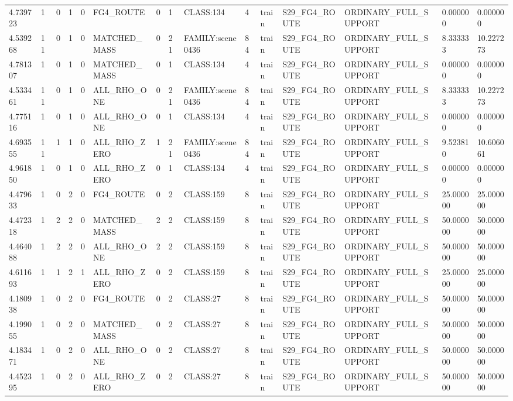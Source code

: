 \begin{tabular}{lllllllllllllll}
4.739723 & 1 & 0 & 1 & 0 & FG4\_ROUTE & 0 & 1 & CLASS:134 & 4 & train & S29\_FG4\_ROUTE & ORDINARY\_FULL\_SUPPORT & 0.000000 & 0.000000 \\
4.539268 & 11 & 0 & 1 & 0 & MATCHED\_MASS & 0 & 21 & FAMILY:scene0436 & 84 & train & S29\_FG4\_ROUTE & ORDINARY\_FULL\_SUPPORT & 8.333333 & 10.227273 \\
4.781307 & 1 & 0 & 1 & 0 & MATCHED\_MASS & 0 & 1 & CLASS:134 & 4 & train & S29\_FG4\_ROUTE & ORDINARY\_FULL\_SUPPORT & 0.000000 & 0.000000 \\
4.533461 & 11 & 0 & 1 & 0 & ALL\_RHO\_ONE & 0 & 21 & FAMILY:scene0436 & 84 & train & S29\_FG4\_ROUTE & ORDINARY\_FULL\_SUPPORT & 8.333333 & 10.227273 \\
4.775116 & 1 & 0 & 1 & 0 & ALL\_RHO\_ONE & 0 & 1 & CLASS:134 & 4 & train & S29\_FG4\_ROUTE & ORDINARY\_FULL\_SUPPORT & 0.000000 & 0.000000 \\
4.693555 & 11 & 1 & 1 & 0 & ALL\_RHO\_ZERO & 1 & 21 & FAMILY:scene0436 & 84 & train & S29\_FG4\_ROUTE & ORDINARY\_FULL\_SUPPORT & 9.523810 & 10.606061 \\
4.961850 & 1 & 0 & 1 & 0 & ALL\_RHO\_ZERO & 0 & 1 & CLASS:134 & 4 & train & S29\_FG4\_ROUTE & ORDINARY\_FULL\_SUPPORT & 0.000000 & 0.000000 \\
4.479633 & 1 & 0 & 2 & 0 & FG4\_ROUTE & 0 & 2 & CLASS:159 & 8 & train & S29\_FG4\_ROUTE & ORDINARY\_FULL\_SUPPORT & 25.000000 & 25.000000 \\
4.472318 & 1 & 2 & 2 & 0 & MATCHED\_MASS & 2 & 2 & CLASS:159 & 8 & train & S29\_FG4\_ROUTE & ORDINARY\_FULL\_SUPPORT & 50.000000 & 50.000000 \\
4.464088 & 1 & 2 & 2 & 0 & ALL\_RHO\_ONE & 2 & 2 & CLASS:159 & 8 & train & S29\_FG4\_ROUTE & ORDINARY\_FULL\_SUPPORT & 50.000000 & 50.000000 \\
4.611693 & 1 & 1 & 2 & 1 & ALL\_RHO\_ZERO & 0 & 2 & CLASS:159 & 8 & train & S29\_FG4\_ROUTE & ORDINARY\_FULL\_SUPPORT & 25.000000 & 25.000000 \\
4.180938 & 1 & 0 & 2 & 0 & FG4\_ROUTE & 0 & 2 & CLASS:27 & 8 & train & S29\_FG4\_ROUTE & ORDINARY\_FULL\_SUPPORT & 50.000000 & 50.000000 \\
4.199055 & 1 & 0 & 2 & 0 & MATCHED\_MASS & 0 & 2 & CLASS:27 & 8 & train & S29\_FG4\_ROUTE & ORDINARY\_FULL\_SUPPORT & 50.000000 & 50.000000 \\
4.183471 & 1 & 0 & 2 & 0 & ALL\_RHO\_ONE & 0 & 2 & CLASS:27 & 8 & train & S29\_FG4\_ROUTE & ORDINARY\_FULL\_SUPPORT & 50.000000 & 50.000000 \\
4.452395 & 1 & 0 & 2 & 0 & ALL\_RHO\_ZERO & 0 & 2 & CLASS:27 & 8 & train & S29\_FG4\_ROUTE & ORDINARY\_FULL\_SUPPORT & 50.000000 & 50.000000 \\

\end{tabular}
